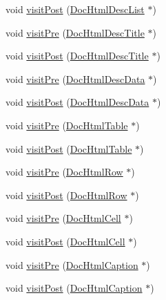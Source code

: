 \begin{DoxyCompactItemize}
\item 
void \hyperlink{class_html_doc_visitor_af95525bdf0b4eab88af6934115758b2d}{visit\+Post} (\hyperlink{class_doc_html_desc_list}{Doc\+Html\+Desc\+List} $\ast$)
\item 
void \hyperlink{class_html_doc_visitor_ad667fe09af96afd49a232bdbe261a4cf}{visit\+Pre} (\hyperlink{class_doc_html_desc_title}{Doc\+Html\+Desc\+Title} $\ast$)
\item 
void \hyperlink{class_html_doc_visitor_a5806747756cf80368574d9ca867a1d8b}{visit\+Post} (\hyperlink{class_doc_html_desc_title}{Doc\+Html\+Desc\+Title} $\ast$)
\item 
void \hyperlink{class_html_doc_visitor_adab6b08784cb81f53c728b41eb7c471a}{visit\+Pre} (\hyperlink{class_doc_html_desc_data}{Doc\+Html\+Desc\+Data} $\ast$)
\item 
void \hyperlink{class_html_doc_visitor_a652c33b399ab16c468a09daa8d712421}{visit\+Post} (\hyperlink{class_doc_html_desc_data}{Doc\+Html\+Desc\+Data} $\ast$)
\item 
void \hyperlink{class_html_doc_visitor_ac59f0577c7d7540f19f829fd7619363d}{visit\+Pre} (\hyperlink{class_doc_html_table}{Doc\+Html\+Table} $\ast$)
\item 
void \hyperlink{class_html_doc_visitor_afba6ff64ba2be044020c9b936925e6c4}{visit\+Post} (\hyperlink{class_doc_html_table}{Doc\+Html\+Table} $\ast$)
\item 
void \hyperlink{class_html_doc_visitor_a2dfdbfb919b93998fbd33fe39904ca6b}{visit\+Pre} (\hyperlink{class_doc_html_row}{Doc\+Html\+Row} $\ast$)
\item 
void \hyperlink{class_html_doc_visitor_a7f7ed0f1861859f786eeffa0eeace89a}{visit\+Post} (\hyperlink{class_doc_html_row}{Doc\+Html\+Row} $\ast$)
\item 
void \hyperlink{class_html_doc_visitor_a39a7ce4607fe6ca4bba72fafa91f594b}{visit\+Pre} (\hyperlink{class_doc_html_cell}{Doc\+Html\+Cell} $\ast$)
\item 
void \hyperlink{class_html_doc_visitor_a41eff2bba7fab8d8715b89a788a262fb}{visit\+Post} (\hyperlink{class_doc_html_cell}{Doc\+Html\+Cell} $\ast$)
\item 
void \hyperlink{class_html_doc_visitor_aa901a3fd38aa8a8a2288a91197f17d24}{visit\+Pre} (\hyperlink{class_doc_html_caption}{Doc\+Html\+Caption} $\ast$)
\item 
void \hyperlink{class_html_doc_visitor_a62e60c14c5f20fc65b10a662874af1cf}{visit\+Post} (\hyperlink{class_doc_html_caption}{Doc\+Html\+Caption} $\ast$)
\item 

\end{DoxyCompactItemize}
